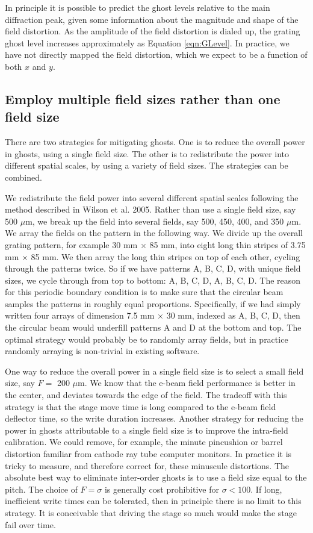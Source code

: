 In principle it is possible to predict the ghost levels relative to the main diffraction peak, given some information about the magnitude and shape of the field distortion.  As the amplitude of the field distortion is dialed up, the grating ghost level increases approximately as Equation \ref{eqn:GLevel}.  In practice, we have not directly mapped the field distortion, which we expect to be a function of both $x $ and $y$.

\subsection{Employ multiple field sizes rather than one field size}
\label{sec:MultipleFields}
There are two strategies for mitigating ghosts.  One is to reduce the overall power in ghosts, using a single field size.  The other is to redistribute the power into different spatial scales, by using a variety of field sizes.  The strategies can be combined.

We redistribute the field power into several different spatial scales following the method described in Wilson et al. 2005\cite{2005SPIE.5720...68W}.  Rather than use a single field size, say 500 $\mu$m, we break up the field into several fields, say 500, 450, 400, and 350 $\mu$m.  We array the fields on the pattern in the following way.  We divide up the overall grating pattern, for example 30 mm $\times$ 85 mm, into eight long thin stripes of 3.75 mm $\times$ 85 mm.  We then array the long thin stripes on top of each other, cycling through the patterns twice.  So if we have patterns A, B, C, D, with unique field sizes, we cycle through from top to bottom: A, B, C, D, A, B, C, D.  The reason for this periodic boundary condition is to make sure that the circular beam samples the patterns in roughly equal proportions.  Specifically, if we had simply written four arrays of dimension 7.5 mm $\times$ 30 mm, indexed as A, B, C, D, then the circular beam would underfill patterns A and D at the bottom and top.  The optimal strategy would probably be to randomly array fields, but in practice randomly arraying is non-trivial in existing software.

One way to reduce the overall power in a single field size is to select a small field size, say $F=$ 200 $\mu$m.   We know that the e-beam field performance is better in the center, and deviates towards the edge of the field.  The tradeoff with this strategy is that the stage move time is long compared to the e-beam field deflector time, so the write duration increases.  Another strategy for reducing the power in ghosts attributable to a single field size is to improve the intra-field calibration.   We could remove, for example, the minute pincushion or barrel distortion familiar from cathode ray tube computer monitors.  In practice it is tricky to measure, and therefore correct for, these minuscule distortions.  The absolute best way to eliminate inter-order ghosts is to use a field size equal to the pitch.  The choice of $F= \sigma$ is generally cost prohibitive for $\sigma <100$.  If long, inefficient write times can be tolerated, then in principle there is no limit to this strategy.  It is conceivable that driving the stage so much would make the stage fail over time.

